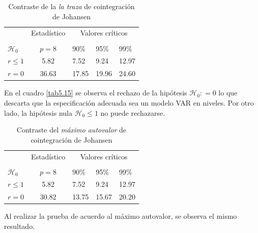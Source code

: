 \documentclass[12pt, twoside]{book}\usepackage[]{graphicx}\usepackage[]{color}
\numberwithin{equation}{section}
\numberwithin{theorem}{section}
\numberwithin{teorema}{section}
\numberwithin{defi}{section}
\numberwithin{prop}{section}
\numberwithin{defi}{section}
\theoremstyle{plain}
\begin{document}
\begin{table}[h]
\caption{Contraste de la \textit{la traza} de cointegración de Johansen\label{tab5.15}}
\begin{center}
\begin{tabular}{@{}lrllll@{}}
\toprule
\multicolumn{1}{l}{} & \multicolumn{2}{c}{Estadístico} &
\multicolumn{3}{c}{Valores críticos} \\
\cmidrule(l){2-3} \cmidrule(l){4-6} \\
\multicolumn{1}{l}{$\mathcal{H}_0$} & \multicolumn{2}{c}{$p = 8$} &
\multicolumn{1}{l}{90\%}&
\multicolumn{1}{l}{95\%}&
\multicolumn{1}{l}{99\%}
\\
\midrule
$r \leq 1$  & \multicolumn{2}{c}{5.82}  & 7.52 & 9.24 & 12.97\\
$r = 0$     & \multicolumn{2}{c}{ 36.63}  & 17.85 & 19.96 & 24.60\\
\bottomrule
\end{tabular}
\end{center}
\label{tab-10}
\end{table}

En el cuadro \ref{tab5.15} se observa el rechazo de la hipótesis $\mathcal{H}_{0}: = 0$ lo que descarta que la especificación adecuada sea un modelo VAR en niveles. Por otro lado, la hipótesis nula $\mathcal{H}_{0}\leq 1$ no puede rechazarse. 


\begin{table}[h]
\caption{Contraste del \textit{máximo autovalor} de cointegración de Johansen\label{tab5.16}}
\begin{center}
\begin{tabular}{@{}lrllll@{}}
\toprule
\multicolumn{1}{l}{} & \multicolumn{2}{c}{Estadístico} & \multicolumn{3}{c}{Valores críticos} \\
\cmidrule(l){2-3} \cmidrule(l){4-6} \\
\multicolumn{1}{l}{$\mathcal{H}_0$} & \multicolumn{2}{c}{$p = 8$} &
\multicolumn{1}{l}{90\%}&
\multicolumn{1}{l}{95\%}&
\multicolumn{1}{l}{99\%}
\\
\midrule
$r \leq 1$ & \multicolumn{2}{c}{5.82} & 7.52 & 9.24 & 12.97 \\
$r = 0$ & \multicolumn{2}{c}{30.82} & 13.75 & 15.67 & 20.20 \\
\bottomrule
\end{tabular}
\end{center}
\label{tab-11}
\end{table}

Al realizar la prueba de acuerdo al máximo autovalor, se observa el mismo resultado. 
\end{document}
